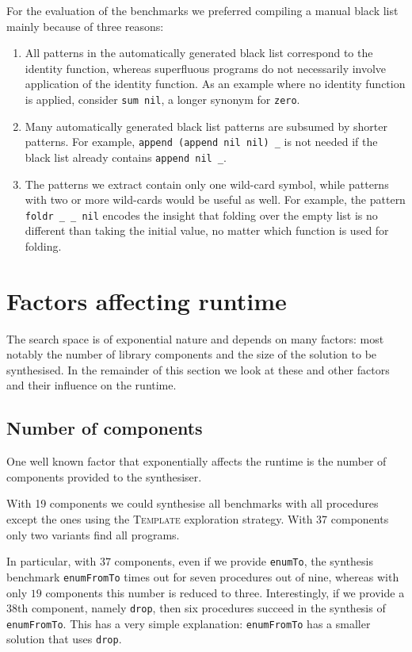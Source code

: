 For the evaluation of the benchmarks we preferred compiling a manual black list mainly because of three reasons: 
\begin{enumerate}
\item All patterns in the automatically generated black list correspond to the identity function, whereas superfluous programs do not necessarily involve application of the identity function. As an example where no identity function is applied, consider \lstinline!sum nil!, a longer synonym for \lstinline!zero!.
\item Many automatically generated black list patterns are subsumed by shorter patterns. For example, \lstinline?append (append nil nil) _? is not needed if the black list already contains \lstinline?append nil _?.
\item The patterns we extract contain only one wild-card symbol, while patterns with two or more wild-cards would be useful as well. For example, the pattern \lstinline?foldr _ _ nil? encodes the insight that folding over the empty list is no different than taking the initial value, no matter which function is used for folding.
\end{enumerate}


\section{Factors affecting runtime}\label{Factors affecting runtime}
The search space is of exponential nature and depends on many factors: most notably the number of library components and the size of the solution to be synthesised. In the remainder of this section we look at these and other factors and their influence on the runtime.

\subsection{Number of components}
One well known factor that exponentially affects the runtime is the number of components provided to the synthesiser.

With 19 components we could synthesise all benchmarks with all procedures except the ones using the \textsc{Template} exploration strategy. With 37 components only two variants find all programs.

In particular, with $37$ components, even if we provide \lstinline?enumTo?, the synthesis benchmark \lstinline?enumFromTo? times out for seven procedures out of nine, whereas with only $19$ components this number is reduced to three.
Interestingly, if we provide a $38$th component, namely \lstinline?drop?, then six procedures succeed in the synthesis of \lstinline?enumFromTo?. This has a very simple explanation: \lstinline?enumFromTo? has a smaller solution that uses \lstinline?drop?.

